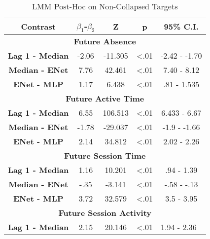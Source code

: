 \begin{table}[h]
\centering
\caption{LMM Post-Hoc on Non-Collapsed Targets}
\label{exploded_target_lmm_post_hoc}
\begin{tabular}{ccccc}
\hline
\textbf{Contrast}  & \textbf{$\beta_1$-$\beta_2$} & \textbf{Z} & \textbf{p} & \textbf{95\% C.I.}                  \\ \hline
\multicolumn{5}{c}{\textbf{Future Absence}}                                                                         \\ \hline
\textbf{Lag 1 - Median} & -2.06                & -11.305     & \textless .01   & -2.42 - -1.70                     \\
\textbf{Median - ENet}           & 7.76                & 42.461     & \textless .01   & 7.40 - 8.12                     \\
\textbf{ENet - MLP}          & 1.17                & 6.438     & \textless .01   & .81 - 1.535                    \\ \hline
\multicolumn{5}{c}{\textbf{Future Active Time}}                                                                     \\ \hline
\textbf{Lag 1 - Median} & 6.55                & 106.513      & \textless .01  & 6.433 - 6.67                     \\
\textbf{Median - ENet}           & -1.78                & -29.037    & \textless .01  & -1.9 - -1.66                     \\
\textbf{ENet - MLP}          & 2.14                & 34.812     & \textless .01  & 2.02 - 2.26                     \\\hline
\multicolumn{5}{c}{\textbf{Future Session Time}}                                                                     \\ \hline
\textbf{Lag 1 - Median} & 1.16                & 10.201     & \textless .01  & .94 - 1.39                     \\
\textbf{Median - ENet}            & -.35                & -3.141     & \textless .01  & -.58 - -.13                     \\
\textbf{ENet - MLP}          & 3.72                & 32.579     & \textless .01  & 3.5 - 3.95                     \\ \hline
\multicolumn{5}{c}{\textbf{Future Session Activity}}                                                                 \\ \hline
\textbf{Lag 1 - Median} & 2.15                & 20.146     & \textless .01  & \multicolumn{1}{l}{1.94 - 2.36} \\

\end{tabular}
\end{table}

